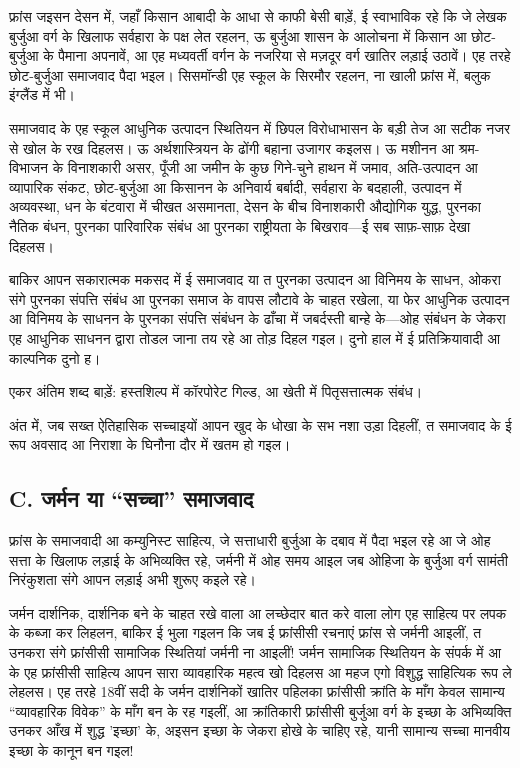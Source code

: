 \documentclass[12pt,a4paper,oneside]{book}
\begin{document}
फ्रांस जइसन देसन में, जहाँ किसान आबादी के आधा से काफी बेसी बाड़ें, ई स्वाभाविक रहे कि जे लेखक बुर्जुआ वर्ग के खिलाफ सर्वहारा के पक्ष लेत रहलन, ऊ बुर्जुआ शासन के आलोचना में किसान आ छोट-बुर्जुआ के पैमाना अपनावें, आ एह मध्यवर्ती वर्गन के नजरिया से मज़दूर वर्ग खातिर लड़ाई उठावें। एह तरहे छोट-बुर्जुआ समाजवाद पैदा भइल। सिसमॉन्डी एह स्कूल के सिरमौर रहलन, ना खाली फ्रांस में, बलुक इंग्लैंड में भी।

समाजवाद के एह स्कूल आधुनिक उत्पादन स्थितियन में छिपल विरोधाभासन के बड़ी तेज आ सटीक नजर से खोल के रख दिहलस। ऊ अर्थशास्त्रियन के ढोंगी बहाना उजागर कइलस। ऊ मशीनन आ श्रम-विभाजन के विनाशकारी असर, पूँजी आ जमीन के कुछ गिने-चुने हाथन में जमाव, अति-उत्पादन आ व्यापारिक संकट, छोट-बुर्जुआ आ किसानन के अनिवार्य बर्बादी, सर्वहारा के बदहाली, उत्पादन में अव्यवस्था, धन के बंटवारा में चीखत असमानता, देसन के बीच विनाशकारी औद्योगिक युद्ध, पुरनका नैतिक बंधन, पुरनका पारिवारिक संबंध आ पुरनका राष्ट्रीयता के बिखराव—ई सब साफ़-साफ़ देखा दिहलस।

बाकिर आपन सकारात्मक मकसद में ई समाजवाद या त पुरनका उत्पादन आ विनिमय के साधन, ओकरा संगे पुरनका संपत्ति संबंध आ पुरनका समाज के वापस लौटावे के चाहत रखेला, या फेर आधुनिक उत्पादन आ विनिमय के साधनन के पुरनका संपत्ति संबंधन के ढाँचा में जबर्दस्ती बान्हे के—ओह संबंधन के जेकरा एह आधुनिक साधनन द्वारा तोडल जाना तय रहे आ तोड़ दिहल गइल। दुनो हाल में ई प्रतिक्रियावादी आ काल्पनिक दुनो ह।

एकर अंतिम शब्द बाड़ें: हस्तशिल्प में कॉरपोरेट गिल्ड, आ खेती में पितृसत्तात्मक संबंध।

अंत में, जब सख्त ऐतिहासिक सच्चाइयों आपन खुद के धोखा के सभ नशा उड़ा दिहलीं, त समाजवाद के ई रूप अवसाद आ निराशा के घिनौना दौर में खतम हो गइल।


\subsection*{{\engfont C}. जर्मन या “सच्चा” समाजवाद}
फ्रांस के समाजवादी आ कम्युनिस्ट साहित्य, जे सत्ताधारी बुर्जुआ के दबाव में पैदा भइल रहे आ जे ओह सत्ता के खिलाफ लड़ाई के अभिव्यक्ति रहे, जर्मनी में ओह समय आइल जब ओहिजा के बुर्जुआ वर्ग सामंती निरंकुशता संगे आपन लड़ाई अभी शुरूए कइले रहे।

जर्मन दार्शनिक, दार्शनिक बने के चाहत रखे वाला आ लच्छेदार बात करे वाला लोग एह साहित्य पर लपक के कब्जा कर लिहलन, बाकिर ई भुला गइलन कि जब ई फ्रांसीसी रचनाएं फ्रांस से जर्मनी आइलीं, त उनकरा संगे फ्रांसीसी सामाजिक स्थितियां जर्मनी ना आइलीं! जर्मन सामाजिक स्थितियन के संपर्क में आ के एह फ्रांसीसी साहित्य आपन सारा व्यावहारिक महत्व खो दिहलस आ महज एगो विशुद्ध साहित्यिक रूप ले लेहलस। एह तरहे 18वीं सदी के जर्मन दार्शनिकों खातिर पहिलका फ्रांसीसी क्रांति के माँग केवल सामान्य “व्यावहारिक विवेक” के माँग बन के रह गइलीं, आ क्रांतिकारी फ्रांसीसी बुर्जुआ वर्ग के इच्छा के अभिव्यक्ति उनकर आँख में शुद्ध 'इच्छा' के, अइसन इच्छा के जेकरा होखे के चाहिए रहे, यानी सामान्य सच्चा मानवीय इच्छा के कानून बन गइल!
\end{document}
